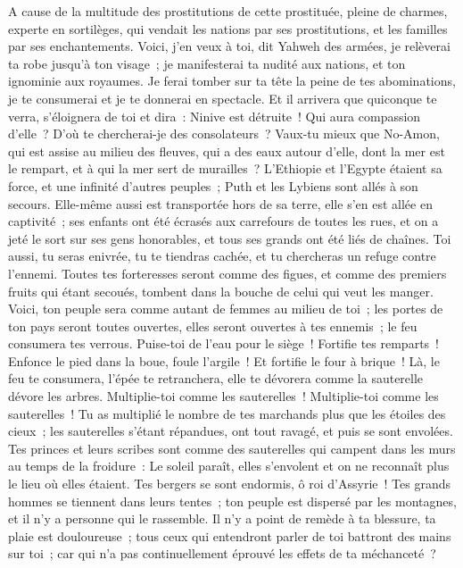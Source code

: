 \begin{multicols}{2}
A cause de la multitude des prostitutions de cette prostituée, pleine de charmes, experte en sortilèges, qui vendait les nations par ses prostitutions, et les familles par ses enchantements.
Voici, j'en veux à toi, dit Yahweh des armées, je relèverai ta robe jusqu'à ton visage~; je manifesterai ta nudité aux nations, et ton ignominie aux royaumes.
Je ferai tomber sur ta tête la peine de tes abominations, je te consumerai et je te donnerai en spectacle.
Et il arrivera que quiconque te verra, s'éloignera de toi et dira~: Ninive est détruite~! Qui aura compassion d'elle~? D'où te chercherai-je des consolateurs~?
Vaux-tu mieux que No-Amon, qui est assise au milieu des fleuves, qui a des eaux autour d'elle, dont la mer est le rempart, et à qui la mer sert de murailles~?
L'Ethiopie et l'Egypte étaient sa force, et une infinité d'autres peuples~; Puth et les Lybiens sont allés à son secours.
Elle-même aussi est transportée hors de sa terre, elle s'en est allée en captivité~; ses enfants ont été écrasés aux carrefours de toutes les rues, et on a jeté le sort sur ses gens honorables, et tous ses grands ont été liés de chaînes.
Toi aussi, tu seras enivrée, tu te tiendras cachée, et tu chercheras un refuge contre l'ennemi.
Toutes tes forteresses seront comme des figues, et comme des premiers fruits qui étant secoués, tombent dans la bouche de celui qui veut les manger.
Voici, ton peuple sera comme autant de femmes au milieu de toi~; les portes de ton pays seront toutes ouvertes, elles seront ouvertes à tes ennemis~; le feu consumera tes verrous.
Puise-toi de l'eau pour le siège~! Fortifie tes remparts~! Enfonce le pied dans la boue, foule l'argile~! Et fortifie le four à brique~!
Là, le feu te consumera, l'épée te retranchera, elle te dévorera comme la sauterelle dévore les arbres. Multiplie-toi comme les sauterelles~! Multiplie-toi comme les sauterelles~!
Tu as multiplié le nombre de tes marchands plus que les étoiles des cieux~; les sauterelles s'étant répandues, ont tout ravagé, et puis se sont envolées.
Tes princes et leurs scribes sont comme des sauterelles qui campent dans les murs au temps de la froidure~: Le soleil paraît, elles s'envolent et on ne reconnaît plus le lieu où elles étaient.
Tes bergers se sont endormis, ô roi d'Assyrie~! Tes grands hommes se tiennent dans leurs tentes~; ton peuple est dispersé par les montagnes, et il n'y a personne qui le rassemble.
Il n'y a point de remède à ta blessure, ta plaie est douloureuse~; tous ceux qui entendront parler de toi battront des mains sur toi~; car qui n'a pas continuellement éprouvé les effets de ta méchanceté~?
\PPE{}
\end{multicols}
